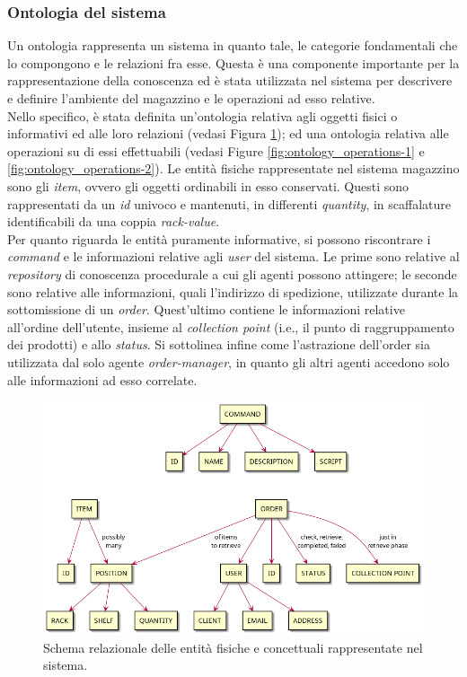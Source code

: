 \subsubsection{Ontologia del sistema}
Un ontologia rappresenta un sistema in quanto tale, le categorie fondamentali che lo compongono e le relazioni fra esse. Questa è una componente importante per la rappresentazione della conoscenza ed è stata utilizzata nel sistema per descrivere e definire l'ambiente del magazzino e le operazioni ad esso relative.\\
Nello specifico, è stata definita un'ontologia relativa agli oggetti fisici o informativi ed alle loro relazioni (vedasi Figura \ref{fig:ontology_abstractions}); ed una ontologia relativa alle operazioni su di essi effettuabili (vedasi Figure \ref{fig:ontology_operations-1} e \ref{fig:ontology_operations-2}).
%
\parag
Le entità fisiche rappresentate nel sistema magazzino sono gli \textit{item}, ovvero gli oggetti ordinabili in esso conservati. Questi sono rappresentati da un \textit{id} univoco e mantenuti, in differenti \textit{quantity}, in scaffalature identificabili da una coppia \textit{rack-value}.\\
Per quanto riguarda le entità puramente informative, si possono riscontrare i \textit{command} e le informazioni relative agli \textit{user} del sistema. Le prime sono relative al \textit{repository} di conoscenza procedurale a cui gli agenti possono attingere; le seconde sono relative alle informazioni, quali l'indirizzo di spedizione, utilizzate durante la sottomissione di un \textit{order}. Quest'ultimo contiene le informazioni relative all'ordine dell'utente, insieme al \textit{collection point} (i.e., il punto di raggruppamento dei prodotti) e allo \textit{status}. Si sottolinea infine come l'astrazione dell'order sia utilizzata dal solo agente \textit{order-manager}, in quanto gli altri agenti accedono solo alle informazioni ad esso correlate.
\begin{figure}[ht]
    \includegraphics[width=\textwidth]{section/design/figure/ontology/ontology-abstractions.png}
    \caption{Schema relazionale delle entità fisiche e concettuali rappresentate nel sistema.}
    \label{fig:ontology_abstractions}
\end{figure}
